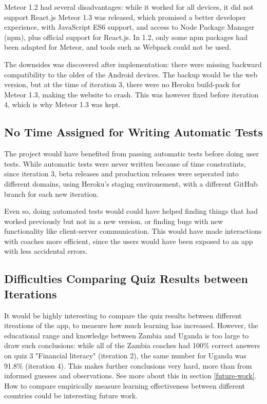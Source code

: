 Meteor 1.2 had several disadvantages: while it worked for all devices, it did not support React.js Meteor 1.3 was released, which promised a better developer experience, with JavaScript ES6 support, and access to Node Package Manager (npm), plus official support for React.js. In 1.2, only some npm packages had been adapted for Meteor, and tools such as Webpack could not be used.

The downsides was discovered after implementation: there were missing backward compatibility to the older of the Android devices. The backup would be the web version, but at the time of iteration 3, there were no Heroku build-pack for Meteor 1.3, making the website to crash. This was however fixed before iteration 4, which is why Meteor 1.3 was kept.

\subsection{No Time Assigned for Writing Automatic Tests}
The project would have benefited from passing automatic tests before doing user tests. While automatic tests were never written because of time constratints, since iteration 3, beta releases and production releases were seperated into different domains, using Heroku's staging environement, with a different GitHub branch for each new iteration.

Even so, doing automated tests would could have helped finding things that had worked previously but not in a new version, or finding bugs with new functionality like client-server communication. This would have made interactions with coaches more efficient, since the users would have been exposed to an app with less accidental errors.

\subsection{Difficulties Comparing Quiz Results between Iterations}
It would be highly interesting to compare the quiz results between different itreations of the app, to measure how much learning has increased. However, the educational range and knowledge between Zambia and Uganda is too large to draw such conclusions: while all of the Zambia coaches had 100\% correct answers on quiz 3 "Financial literacy" (iteration 2), the same number for Uganda was 91.8\% (iteration 4). This makes further conclusions very hard, more than from informed guesses and observations. See more about this in section \ref{future-work}. How to compare empirically measure learning effectiveness between different countries could be interesting future work.

